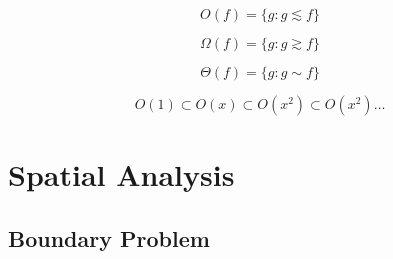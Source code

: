 \[
    O(f) = \{ g : g \lesssim f \}
\]

\[
    \Omega(f) = \{ g : g \gtrsim f \}
\]

\[
    \Theta(f) = \{ g : g \sim f \}
\]

\[
    O(1) \subset O(x) \subset O(x^2) \subset O(x^2) \ldots
\]



\section{Spatial Analysis}\label{sec:spatial_analysis}


\subsection{Boundary Problem}\label{sec:boundary_problem}

